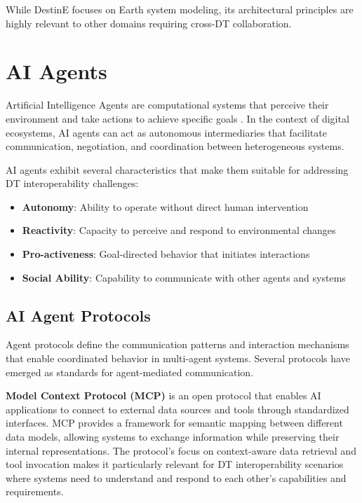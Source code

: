 While DestinE focuses on Earth system modeling, its architectural principles are highly relevant to other domains requiring cross-DT collaboration.

\section{AI Agents}

Artificial Intelligence Agents are computational systems that perceive their environment and take actions to achieve specific goals \cite{Russell_2020}.
In the context of digital ecosystems, AI agents can act as autonomous intermediaries that
    facilitate communication, negotiation, and coordination between heterogeneous systems.

AI agents exhibit several characteristics that make them suitable for addressing DT interoperability challenges:
\begin{itemize}
    \item \textbf{Autonomy}: Ability to operate without direct human intervention
    \item \textbf{Reactivity}: Capacity to perceive and respond to environmental changes
    \item \textbf{Pro-activeness}: Goal-directed behavior that initiates interactions
    \item \textbf{Social Ability}: Capability to communicate with other agents and systems
\end{itemize}

\subsection{AI Agent Protocols}

Agent protocols define the communication patterns and interaction mechanisms that enable coordinated behavior in multi-agent systems. Several protocols have emerged as standards for agent-mediated communication.

\textbf{Model Context Protocol (MCP)} is an open protocol that enables AI applications to connect to external data sources and tools through standardized interfaces. MCP provides a framework for semantic mapping between different data models, allowing systems to exchange information while preserving their internal representations. The protocol's focus on context-aware data retrieval and tool invocation makes it particularly relevant for DT interoperability scenarios where systems need to understand and respond to each other's capabilities and requirements.

